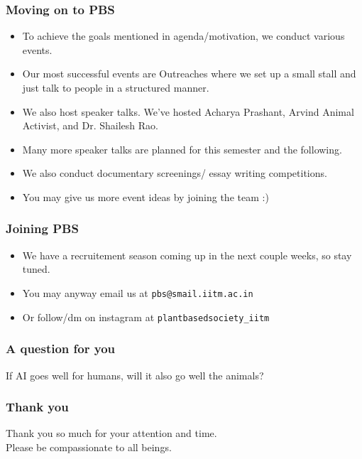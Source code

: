 \documentclass[aspectratio=43]{beamer}
\begin{document}
\begin{frame}
    \frametitle{Moving on to PBS}
    \begin{itemize}
        \item To achieve the goals mentioned in agenda/motivation, we conduct various events.
        \item Our most successful events are Outreaches where we set up a small stall and just talk to people in a structured manner.
        \item We also host speaker talks. We've hosted Acharya Prashant, Arvind Animal Activist, and Dr. Shailesh Rao. 
        \item Many more speaker talks are planned for this semester and the following.
        \item We also conduct documentary screenings/ essay writing competitions.
        \item You may give us more event ideas by joining the team :)
    \end{itemize}
\end{frame}

\begin{frame}
    \frametitle{Joining PBS}
    \begin{itemize}
        \item We have a recruitement season coming up in the next couple weeks, so stay tuned.
        \item You may anyway email us at \texttt{pbs@smail.iitm.ac.in}
        \item Or follow/dm on instagram at \texttt{plantbasedsociety\_iitm}
    \end{itemize}
\end{frame}

\begin{frame}
    \frametitle{A question for you}
    \begin{center}
        If AI goes well for humans, will it also go well the animals?
    \end{center}
\end{frame}

\begin{frame}
    \frametitle{Thank you}
    \begin{center}
        Thank you so much for your attention and time.\\
        Please be compassionate to all beings.
    \end{center}
\end{frame}
\end{document}
